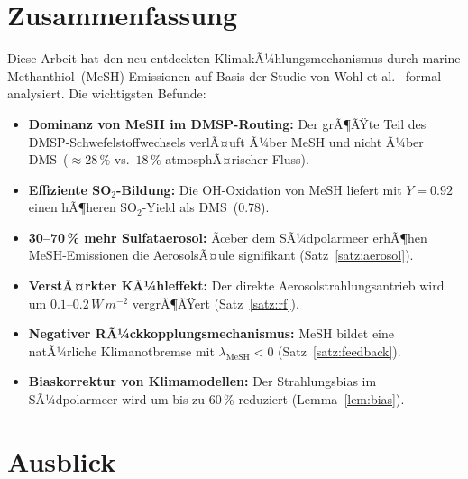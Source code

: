 ﻿\documentclass[a4paper,12pt]{article}
\theoremstyle{definition}
\begin{document}
\section{Zusammenfassung}

Diese Arbeit hat den neu entdeckten KlimakÃ¼hlungsmechanismus durch marine Methanthiol~(MeSH)-Emissionen
auf Basis der Studie von Wohl et al.~\cite{wohl2024} formal analysiert. Die wichtigsten Befunde:

\begin{itemize}
  \item \textbf{Dominanz von MeSH im DMSP-Routing:} Der grÃ¶ÃŸte Teil des DMSP-Schwefelstoffwechsels
        verlÃ¤uft Ã¼ber MeSH und nicht Ã¼ber DMS~($\approx 28\,\%$ vs.\ $18\,\%$ atmosphÃ¤rischer Fluss).
  \item \textbf{Effiziente SO$_2$-Bildung:} Die OH-Oxidation von MeSH liefert mit $Y = 0.92$
        einen hÃ¶heren SO$_2$-Yield als DMS~(0.78).
  \item \textbf{30--70\,\% mehr Sulfataerosol:} Ãœber dem SÃ¼dpolarmeer erhÃ¶hen MeSH-Emissionen die
        AerosolsÃ¤ule signifikant (Satz~\ref{satz:aerosol}).
  \item \textbf{VerstÃ¤rkter KÃ¼hleffekt:} Der direkte Aerosolstrahlungsantrieb wird um
        $0.1$--$0.2\,\si{W\,m^{-2}}$ vergrÃ¶ÃŸert (Satz~\ref{satz:rf}).
  \item \textbf{Negativer RÃ¼ckkopplungsmechanismus:} MeSH bildet eine natÃ¼rliche Klimanotbremse
        mit $\lambda_{\mathrm{MeSH}} < 0$ (Satz~\ref{satz:feedback}).
  \item \textbf{Biaskorrektur von Klimamodellen:} Der Strahlungsbias im SÃ¼dpolarmeer wird um
        bis zu $60\,\%$ reduziert (Lemma~\ref{lem:bias}).
\end{itemize}

\section{Ausblick}
\end{document}
